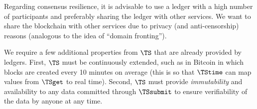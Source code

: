 Regarding consensus resilience, it is advisable to use a ledger with a high 
number of participants and preferably sharing the ledger with other services.
We want to share the blockchain with other services due to privacy (and 
anti-censorship) reasons (analogous to the idea of \enquote{domain fronting}).

We require a few additional properties from \(\TS\) that are already provided 
by ledgers.
First, \(\TS\) must be continuously extended, such as in Bitcoin in which 
blocks are created every 10 minutes on average (this is so that \(\TStime\) can 
map values from \(\TSget\) to real time).
Second, \(\TS\) must provide \emph{immutability} and availability to any data 
committed through \(\TSsubmit\) to ensure verifiability of the data by anyone 
at any time.


